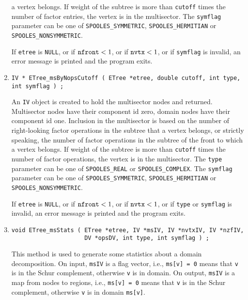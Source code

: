 \begin{enumerate}
a vertex belongs.
If weight of the subtree is more than {\tt cutoff} times the number
of factor entries, the vertex is in the multisector.
The {\tt symflag} parameter can be one of {\tt SPOOLES\_SYMMETRIC},
{\tt SPOOLES\_HERMITIAN} or {\tt SPOOLES\_NONSYMMETRIC}.
\par {}
If {\tt etree} is {\tt NULL},
or if ${\tt nfront} < 1$,
or if ${\tt nvtx} < 1$,
or if {\tt symflag} is invalid,
an error message is printed and the program exits.
\item
\begin{verbatim}
IV * ETree_msByNopsCutoff ( ETree *etree, double cutoff, int type, int symflag ) ;
\end{verbatim}
An {\tt IV} object is created to hold the multisector nodes
and returned.
Multisector nodes have their component id zero,
domain nodes have their component id one.
Inclusion in the multisector is based on the number of right-looking
factor operations in the subtree that a vertex belongs, 
or strictly speaking, the number of factor operations 
in the subtree of the front to which a vertex belongs.
If weight of the subtree is more than {\tt cutoff} times the number
of factor operations, the vertex is in the multisector.
The {\tt type} parameter can be one of {\tt SPOOLES\_REAL} or
{\tt SPOOLES\_COMPLEX}.
The {\tt symflag} parameter can be one of {\tt SPOOLES\_SYMMETRIC},
{\tt SPOOLES\_HERMITIAN} or {\tt SPOOLES\_NONSYMMETRIC}.
\par {}
If {\tt etree} is {\tt NULL},
or if ${\tt nfront} < 1$,
or if ${\tt nvtx} < 1$,
or if {\tt type} or {\tt symflag} is invalid,
an error message is printed and the program exits.
\item
\begin{verbatim}
void ETree_msStats ( ETree *etree, IV *msIV, IV *nvtxIV, IV *nzfIV, 
                     DV *opsDV, int type, int symflag ) ;
\end{verbatim}
This method is used to generate some statistics about a domain
decomposition.
On input, {\tt msIV} is a flag vector,
i.e., {\tt ms[v] = 0} means that {\tt v} is in the Schur
complement, otherwise {\tt v} is in domain.
On output, {\tt msIV} is a map from nodes to regions,
i.e., {\tt ms[v] = 0} means that {\tt v} is in the Schur
complement, otherwise {\tt v} is in domain {\tt ms[v]}.

\end{enumerate}

